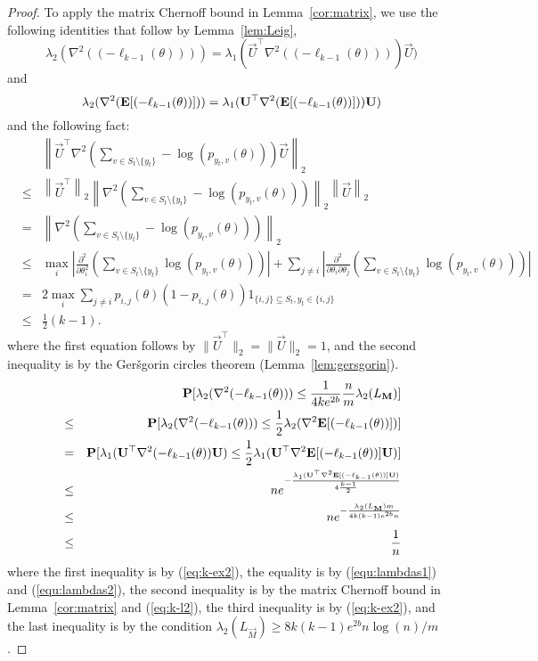 \begin{proof}
To apply the matrix Chernoff bound in Lemma~\ref{cor:matrix}, we use the following identities that follow by Lemma~\ref{lem:Leig},
\begin{equation}
\lambda_2(\nabla^2((-\ell_{k-1}(\theta)))) = \lambda_1(\vec{U}^\top\nabla^2((-\ell_{k-1}(\theta))))\vec{U})
\label{equ:lambdas1}
\end{equation}
and
\begin{equation}
\lambda_2(\nabla^2(\mathbf{E}[(-\ell_{k-1}(\theta))])) = \lambda_1(\mathbf{U}^\top\nabla^2(\mathbf{E}[(-\ell_{k-1}(\theta))]))\mathbf{U})
\label{equ:lambdas2}
\end{equation}
and the following fact:
\begin{eqnarray}
&& \left\|\vec{U}^\top\nabla^2\left(\sum_{v\in S_t\setminus \{y_t\}}-\log(p_{y_t,v}(\theta))\right) \vec{U}\right\|_2 \\
& \leq & \left\|\vec{U}^\top\right\|_2 \left\|\nabla^2\left(\sum_{v\in S_t\setminus \{y_t\}}-\log(p_{y_t,v}(\theta))\right)\right\|_2\left\|\vec{U}\right\|_2\nonumber\\
&=& \left\|\nabla^2\left(\sum_{v\in S_t\setminus \{y_t\}}-\log(p_{y_t,v}(\theta))\right)\right\|_2\nonumber\\
&\leq & \max_{i}\left| \frac{\partial^2 }{\partial \theta_i^2} \left(\sum_{v\in S_t\setminus \{y_t\}}\log(p_{y_t,v}(\theta))\right) \right|+ \sum_{j\neq i} \left| \frac{\partial^2 }{\partial \theta_i \partial \theta_j} \left(\sum_{v\in S_t\setminus \{y_t\}}\log(p_{y_t,v}(\theta))\right) \right| \nonumber\\
&=& 2 \max_{i} \sum_{j\neq i}  p_{i,j}(\theta)(1-p_{i,j}(\theta))1_{\{i,j\}\subseteq S_t, y_t \in \{i,j\}} \\
&\le&  \frac{1}{2}(k-1).
\label{eq:k-l2}
 \end{eqnarray} 
where the first equation follows by $\|\vec{U}^\top\|_2 = \|\vec{U}\|_2 = 1$, and the second inequality is by the Ger\v sgorin circles theorem (Lemma~\ref{lem:gersgorin}).
\begin{eqnarray*}
&& \mathbf{P}[\lambda_2(\nabla^2 (-\ell_{k-1}(\theta)))\leq \frac{1}{4ke^{2b}}\frac{n}{m}\lambda_2(L_{\mathbf{M}})] \\
&\leq & \mathbf{P}[\lambda_2(\nabla^2 (-\ell_{k-1}(\theta)))\leq \frac{1}{2}\lambda_2(\nabla^2 \mathbf{E}[(-\ell_{k-1}(\theta))])]\\
&=& \mathbf{P}[\lambda_1(\mathbf{U}^\top\nabla^2 (-\ell_{k-1}(\theta))\mathbf{U})\leq \frac{1}{2}\lambda_1(\mathbf{U}^\top \nabla^2 \mathbf{E}[(-\ell_{k-1}(\theta))]\mathbf{U})]\\
&\leq & n e^{-\frac{\lambda_1(\mathbf{U}^\top \nabla^2 \mathbf{E}[(-\ell_{k-1}(\theta))]\mathbf{U})}{4\frac{k-1}{2}}}\\
& \leq & n e^{-\frac{\lambda_2(L_{\mathbf{M}})m}{4 k(k-1)e^{2b}n}}\\
& \leq & \frac{1}{n} 
\end{eqnarray*}
where the first inequality is by (\ref{eq:k-ex2}), the equality is by (\ref{equ:lambdas1}) and (\ref{equ:lambdas2}), the second inequality is by the matrix Chernoff bound in Lemma~\ref{cor:matrix} and (\ref{eq:k-l2}), the third inequality is by (\ref{eq:k-ex2}), and the last inequality is by the condition $\lambda_2(L_{\vec{M}}) \geq 8k(k-1)e^{2b} n\log(n)/m$.
\end{proof}

